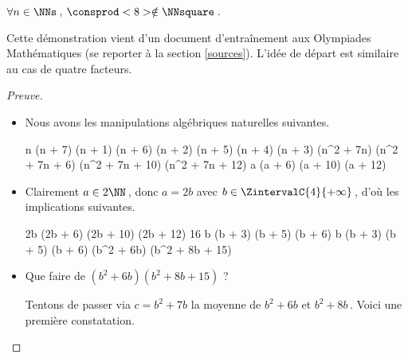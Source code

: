 \begin{fact} \label{case-8}
	 $\forall n \in \NNs$\,, $\consprod<8> \notin \NNsquare$\,.
\end{fact}




Cette démonstration vient d'un document d'entraînement aux Olympiades Mathématiques (se reporter à la section \ref{sources}).
L'idée de départ est similaire au cas de quatre facteurs.


\begin{proof}[Preuve]
	\leavevmode

    \begin{itemize}
    	\item Nous avons les manipulations algébriques naturelles suivantes.
    
        \medskip
        \noindent\kern-6pt%
        \begin{stepcalc}[style = sar]
        \explnext{}
        	n (n + 7) \cdot (n + 1) (n + 6) \cdot (n + 2) (n + 5) \cdot (n + 4) (n + 3) 
        \explnext{}
        	(n^2 + 7n) (n^2 + 7n + 6) (n^2 + 7n + 10) (n^2 + 7n + 12) 
        	a (a + 6) (a + 10) (a + 12)
        \end{stepcalc}
    
    
    	\item Clairement $a \in 2 \NN$\,, donc $a = 2b$ avec $b \in \ZintervalC{4}{+\infty}$\,, d'où les implications suivantes.
    
        \medskip
        \noindent\kern-10pt%
        \begin{stepcalc}[style = ar*, ope=\implies]
        	 \in \NNssquare
        \explnext{}
        	2b (2b + 6) (2b + 10) (2b + 12) \in \NNssquare
        \explnext{}
        	16 b (b + 3) (b + 5) (b + 6) \in \NNssquare
        	b (b + 3) (b + 5) (b + 6) \in \NNssquare
        	(b^2 + 6b) (b^2 + 8b + 15) \in \NNssquare
        \end{stepcalc}
    
    
    	\item Que faire de $(b^2 + 6b) (b^2 + 8b + 15)$ ?
    
        \smallskip
        \noindent%
        Tentons de passer via $c = b^2 + 7b$ la moyenne de $b^2 + 6b$ et $b^2 + 8b$\,. Voici une première constatation.
    

\end{itemize}
\end{proof}
